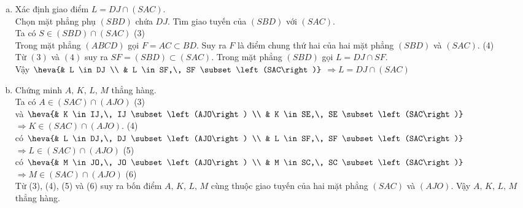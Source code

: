 \begin{bt}
{\begin{enumerate}[a)]
			Từ $(1)$ và $(2)$ suy ra $SE=\left(SBI\right) \cap \left(SAC\right)$.\\
			Trong mặt phẳng $\left(SIB\right)$, gọi $K=IJ \cap SE$.\\
			Ta có $\heva{& K \in IJ \\ & K \in SE, SE \subset \left(SAC\right)}$ $\Rightarrow K=IJ \cap \left(SAC\right)$
			\item Xác định giao điểm $L=DJ \cap \left(SAC\right)$.\\
			Chọn mặt phẳng phụ $\left(SBD\right)$ chứa $DJ$. Tìm giao tuyến của $\left(SBD\right)$ với $\left(SAC\right)$.\\
			Ta có $S \in \left(SBD\right) \cap \left(SAC\right) $ \hfill (3)\\
			\noindent Trong mặt phẳng $\left(ABCD\right)$ gọi $F=AC \subset BD$. Suy ra $F$ là điểm chung thứ hai của hai mặt phẳng $\left(SBD\right)$ và $\left(SAC\right)$. \hfill (4)\\
			Từ $(3)$ và $(4)$ suy ra $SF=\left(SBD\right)\subset \left(SAC\right)$. Trong mặt phẳng $\left(SBD\right)$ gọi $L=DJ \cap SF $.\\
			Vậy
			$\heva{& L \in DJ \\ & L \in SF,\, SF \subset \left(SAC\right)}$ $\Rightarrow L=DJ \cap \left(SAC\right)$
			\item Chứng minh $A,\, K,\, L, \, M$ thẳng hàng.\\
			Ta có $A \in \left(SAC\right)\cap \left(AJO\right)$ \quad (3)\\
			và $\heva{& K \in IJ,\, IJ \subset \left(AJO\right) \\ & K \in SE,\, SE \subset \left(SAC\right)}$ $\Rightarrow K \in \left(SAC\right)\cap \left(AJO\right)$. \quad (4)\\
			có $\heva{& L \in DJ,\, DJ \subset \left(AJO\right) \\ & L \in SF,\, SF \subset \left(SAC\right)}$ $\Rightarrow L \in \left(SAC\right) \cap \left(AJO\right)$ \quad (5)\\
			có $\heva{& M \in JO,\, JO \subset \left(AJO\right) \\ & M \in SC,\, SC \subset \left(SAC\right)}$ $\Rightarrow M \in \left(SAC\right)\cap \left(AJO\right)$ \quad (6)\\
			Từ (3), (4), (5) và (6) suy ra bốn điểm $A,\,K,\, L,\,M$ cùng thuộc giao tuyến của hai mặt phẳng $\left(SAC\right)$ và $\left(AJO\right)$. Vậy $A,\,K,\,L,\,M$ thẳng hàng.
		\end{enumerate}
	}	
\end{bt}


